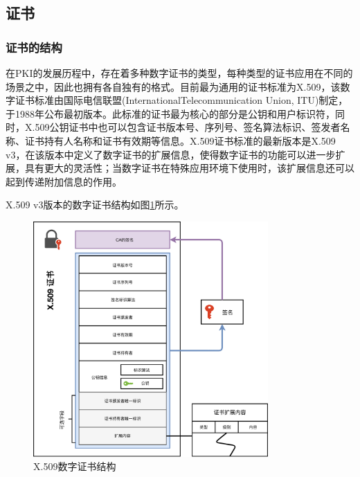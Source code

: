 \subsection{证书}

\subsubsection{证书的结构}


在PKI的发展历程中，存在着多种数字证书的类型，每种类型的证书应用在不同的场景之中，因此也拥有各自独有的格式。目前最为通用的证书标准为X.509，该数字证书标准由国际电信联盟(InternationalTelecommunication Union, ITU)制定，于1988年公布最初版本。此标准的证书最为核心的部分是公钥和用户标识符，同时，X.509公钥证书中也可以包含证书版本号、序列号、签名算法标识、签发者名称、证书持有人名称和证书有效期等信息。X.509证书标准的最新版本是X.509 v3，在该版本中定义了数字证书的扩展信息，使得数字证书的功能可以进一步扩展，具有更大的灵活性；当数字证书在特殊应用环境下使用时，该扩展信息还可以起到传递附加信息的作用。

X.509 v3版本的数字证书结构如图\ref{fig:certificate}所示。

\begin{figure}[htbp]
 	\centering
 	\includegraphics[width = 0.8\textwidth]{img/certificate}
 	\caption{X.509数字证书结构\supercite{fredriksson2017distributed}}\label{fig:certificate}
\end{figure}


